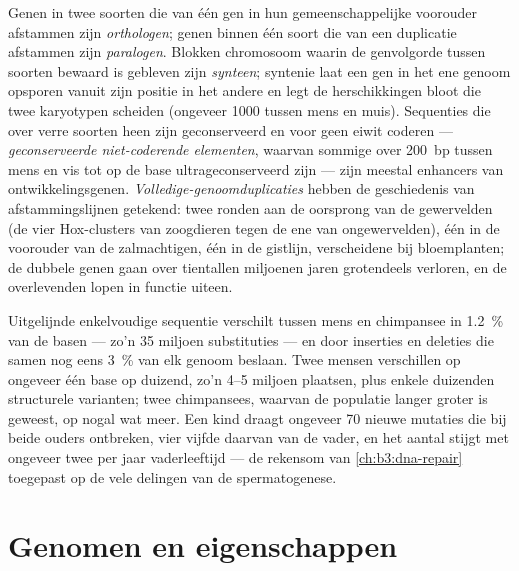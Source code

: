 \begin{definition}\label{def:b3:genomics:comparative}
Genen in twee soorten die van één gen in hun gemeenschappelijke
voorouder afstammen zijn \emph{orthologen}; genen binnen één soort die
van een duplicatie afstammen zijn \emph{paralogen}. Blokken chromosoom
waarin de genvolgorde tussen soorten bewaard is gebleven zijn
\emph{synteen}; syntenie laat een gen in het ene genoom opsporen vanuit
zijn positie in het andere en legt de herschikkingen bloot die twee
karyotypen scheiden (ongeveer \num{1000} tussen mens en muis).
Sequenties die over verre soorten heen zijn geconserveerd en voor geen
eiwit coderen --- \emph{geconserveerde niet-coderende elementen},
waarvan sommige over \qty{200}{bp} tussen mens en vis tot op de base
ultrageconserveerd zijn --- zijn meestal enhancers van
ontwikkelingsgenen. \emph{Volledige-genoomduplicaties} hebben de
geschiedenis van afstammingslijnen getekend: twee ronden aan de
oorsprong van de gewervelden (de vier Hox-clusters van zoogdieren tegen
de ene van ongewervelden), één in de voorouder van de zalmachtigen, één
in de gistlijn, verscheidene bij bloemplanten; de dubbele genen gaan
over tientallen miljoenen jaren grotendeels verloren, en de
overlevenden lopen in functie uiteen.
\end{definition}

\begin{example}\label{ex:b3:genomics:chimp}
Uitgelijnde enkelvoudige sequentie verschilt tussen mens en chimpansee
in \qty{1.2}{\%} van de basen --- zo'n \num{35} miljoen substituties
--- en door inserties en deleties die samen nog eens \qty{3}{\%} van
elk genoom beslaan. Twee mensen verschillen op ongeveer één base op
duizend, zo'n \numrange{4}{5} miljoen plaatsen, plus enkele duizenden
structurele varianten; twee chimpansees, waarvan de populatie langer
groter is geweest, op nogal wat meer. Een kind draagt ongeveer \num{70}
nieuwe mutaties die bij beide ouders ontbreken, vier vijfde daarvan van
de vader, en het aantal stijgt met ongeveer twee per jaar
vaderleeftijd --- de rekensom van \cref{ch:b3:dna-repair} toegepast op
de vele delingen van de spermatogenese.
\end{example}

\section{Genomen en eigenschappen}

